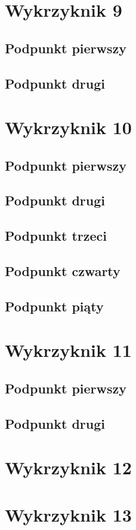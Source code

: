 \documentclass[a4paper,12pt]{article}
\begin{document}
    \section{Wykrzyknik 9}
    	\subsection{Podpunkt pierwszy}
    	\subsection{Podpunkt drugi}
    \section{Wykrzyknik 10}
    	\subsection{Podpunkt pierwszy}
    	\subsection{Podpunkt drugi}
    	\subsection{Podpunkt trzeci}
    	\subsection{Podpunkt czwarty}
    	\subsection{Podpunkt piąty}
    \section{Wykrzyknik 11}
    	\subsection{Podpunkt pierwszy}
    	\subsection{Podpunkt drugi}
    \section{Wykrzyknik 12}
    \section{Wykrzyknik 13}
    
\end{document}
